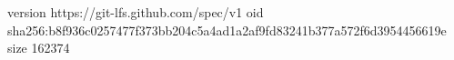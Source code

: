 version https://git-lfs.github.com/spec/v1
oid sha256:b8f936c0257477f373bb204c5a4ad1a2af9fd83241b377a572f6d3954456619e
size 162374
